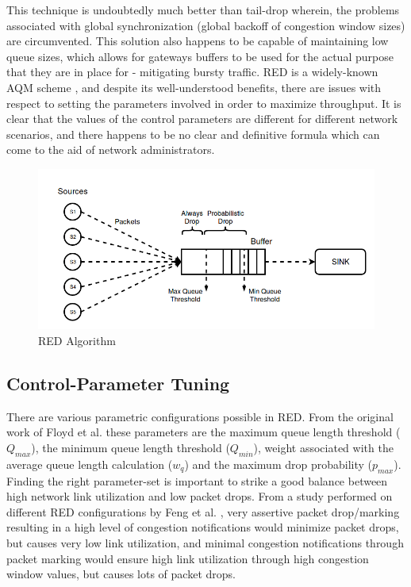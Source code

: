 \documentclass[conference, 10pt]{IEEEtran}
\begin{document}
This technique is undoubtedly much better than tail-drop wherein, the problems associated with global synchronization (global backoff of congestion window sizes) are circumvented. This solution also happens to be capable of maintaining low queue sizes, which allows for gateways buffers to be used for the actual purpose that they are in place for - mitigating bursty traffic. RED is a widely-known AQM scheme \cite{chen2011self}, and despite its well-understood benefits, there are issues with respect to setting the parameters involved in order to maximize throughput. It is clear that the values of the control parameters are different for different network scenarios, and there happens to be no clear and definitive formula which can come to the aid of network administrators.  

\begin{figure}[t]
	\includegraphics[width = \linewidth]{Dg1.png}
	\caption{RED Algorithm}
	\label{fig:1}
\end{figure}

\subsection{Control-Parameter Tuning}
\label{sec:intro:cprtuning}

There are various parametric configurations possible in RED. From the original work of Floyd et al. these parameters are the maximum queue length threshold ($Q_{max}$), the minimum queue length threshold ($Q_{min}$), weight associated with the average queue length calculation ($w_q$) and the maximum drop probability ($p_{max}$). Finding the right parameter-set is important to strike a good balance between high network link utilization and low packet drops. From a study performed on different RED configurations by Feng et al. \cite{feng1999self}, very assertive packet drop/marking resulting in a high level of congestion notifications would minimize packet drops, but causes very low link utilization, and minimal congestion notifications through packet marking would ensure high link utilization through high congestion window values, but causes lots of packet drops.   
\end{document}
